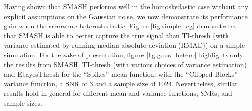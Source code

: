 \documentclass[12pt]{article}
\begin{document}
Having shown that SMASH performs well in the homoskedastic case without any explicit assumptions on the Gaussian noise, we now demonstrate its performance gain when the errors are heteroskedastic. Figure \ref{fig:simple_eg} demonstrates that SMASH is able to better capture the true signal than TI-thresh (with variance estimated by running median absolute deviation (RMAD)) on a simple simulation. For the sake of presentation, figure \ref{fig:gaus_hetero} highlights only the results from SMASH, TI-thresh (with various choices of variance estimation) and EbayesThresh for the ``Spikes'' mean function, with the ``Clipped Blocks'' variance function, a SNR of 3 and a sample size of 1024. Nevertheless, similar results hold in general for different mean and variance functions, SNRs, and sample sizes. 
%
\end{document}
